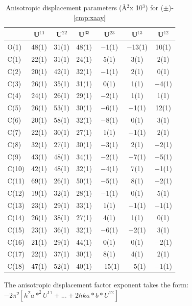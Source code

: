 \onecolumn
\begin{table}[h]
\centering
\footnotesize
\caption{Anisotropic displacement parameters (\AA$^2$x 10$^3$) for ($\pm$)-\ref{cmp:xaay}} 
\begin{tabular}{p{1in}cccccc} 
\toprule
& U$^{11}$ & U$^{22}$ & U$^{33}$ & U$^{23}$ & U$^{13}$ & U$^{12}$ \\
\midrule
O(1)&	48(1) &	31(1)&	48(1) &	$-$1(1)&	$-$13(1) &	10(1) \\
C(1)&	22(1) &	31(1)&	24(1) &	5(1)&	3(1)& 	2(1)\\
C(2)&	20(1) &	42(1)&	32(1) &	$-$1(1)&	2(1)& 	0(1) \\
C(3)&	26(1) &	35(1)&	31(1) &	0(1)&	1(1)& 	$-$4(1)\\
C(4)& 	24(1) &	26(1)&	29(1) &	$-$2(1)&	1(1) &	1(1)\\
C(5)&	26(1) &	53(1)&	30(1) &	$-$6(1)&	$-$1(1)& 	12(1) \\
C(6)&	20(1) &	58(1)&	32(1) &	$-$8(1)&	0(1)& 	3(1)\\
C(7)&	22(1) &	30(1)&	27(1) &	1(1)&	$-$1(1)& 	2(1) \\
C(8)&	32(1) &	27(1)&	30(1) &	$-$3(1)&	2(1) &	$-$2(1) \\
C(9)&	43(1) &	48(1)&	34(1) &	$-$2(1)&	$-$7(1)& 	$-$5(1) \\
C(10)&	42(1) &	48(1)&	32(1) &	$-$4(1)&	7(1) &	$-$1(1)\\
C(11)&	69(1) &	26(1)&	50(1) &	$-$5(1)&	8(1)& 	$-$2(1)\\
C(12)&	19(1) &	32(1)&	28(1) &	$-$1(1)&	0(1)& 	5(1)\\
C(13)&	23(1) &	29(1)&	33(1) &	1(1)&	$-$1(1) &	$-$1(1) \\
C(14)&	26(1) &	38(1)&	27(1) &	4(1)&	1(1)& 	0(1) \\
C(15)&	23(1) &	36(1)&	32(1) &	$-$6(1)&	$-$2(1) &	3(1) \\
C(16)&	21(1) &	29(1)&	44(1) &	0(1)&	0(1) &	$-$2(1)\\
C(17)&	22(1) &	37(1)&	30(1) &	8(1)&	4(1)& 	2(1) \\
C(18)&	47(1) &	52(1)&	40(1) &	$-$15(1)&	$-$5(1) &	$-$1(1) \\
\bottomrule
\end{tabular}
\end{table}
{ \footnotesize
The anisotropic displacement factor exponent takes the form: 
$-2\pi^2\left[ h^2a*^2U^{11} + ... + 2 h k a* b* U^{12} \right]$ }

\pagebreak


